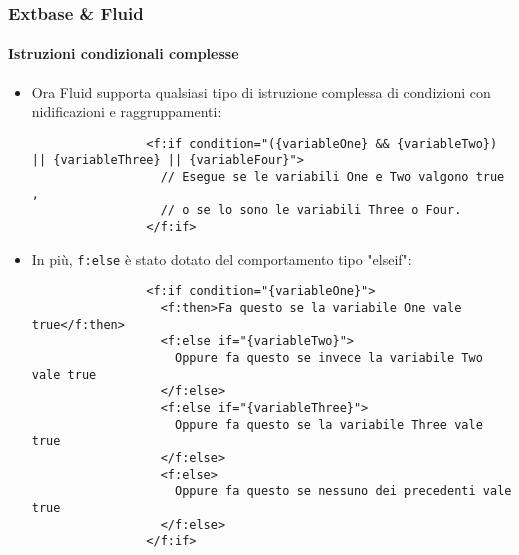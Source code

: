\begin{frame}[fragile]
	\frametitle{Extbase \& Fluid}
	\framesubtitle{Istruzioni condizionali complesse}

	\lstset{basicstyle=\tiny\ttfamily}

	\begin{itemize}

		\item Ora Fluid supporta qualsiasi tipo di istruzione complessa di condizioni con nidificazioni e
			raggruppamenti:

			\begin{lstlisting}
				<f:if condition="({variableOne} && {variableTwo}) || {variableThree} || {variableFour}">
				  // Esegue se le variabili One e Two valgono true ,
				  // o se lo sono le variabili Three o Four.
				</f:if>
			\end{lstlisting}

		\item In più, \texttt{f:else} è stato dotato del comportamento tipo "elseif":

			\begin{lstlisting}
				<f:if condition="{variableOne}">
				  <f:then>Fa questo se la variabile One vale true</f:then>
				  <f:else if="{variableTwo}">
				    Oppure fa questo se invece la variabile Two vale true
				  </f:else>
				  <f:else if="{variableThree}">
				    Oppure fa questo se la variabile Three vale true
				  </f:else>
				  <f:else>
				    Oppure fa questo se nessuno dei precedenti vale true
				  </f:else>
				</f:if>
			\end{lstlisting}

	\end{itemize}

\end{frame}


